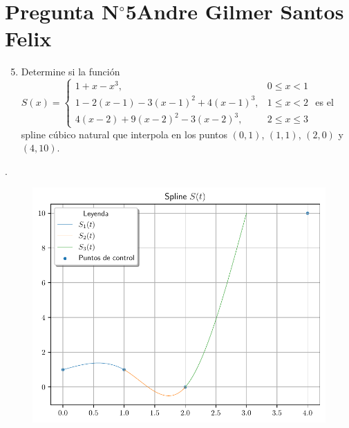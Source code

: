 \section{Pregunta N$^{\circ}$5\qquad Andre Gilmer Santos Felix}

\begin{frame}
    \begin{enumerate}\setcounter{enumi}{4}
        \item


              Determine si la función
              \begin{math}
                  S\left(x\right)=
                  \begin{cases}
                      1+
                      x-
                      x^{3},                   & 0 \leq x<1      \\
                      1-
                      2\left(x-1\right)-
                      3{\left(x-1\right)}^{2}+
                      4{\left(x-1\right)}^{3}, & 1 \leq x<2      \\
                      4\left(x-2\right)+
                      9{\left(x-2\right)}^{2}-
                      3{\left(x-2\right)}^{3}, & 2 \leq x \leq 3
                  \end{cases}
              \end{math}
              es el spline cúbico natural que interpola en los puntos
              $\left(0,1\right)$, $\left(1,1\right)$, $\left(2,0\right)$ y
              $\left(4,10\right)$.
    \end{enumerate}

    \begin{solution}
        .
    \end{solution}
\end{frame}

\begin{frame}
    \begin{solution}
        \begin{figure}[ht!]
            \centering
            \includegraphics[width=.72\paperwidth]{p5}
        \end{figure}
    \end{solution}
\end{frame}